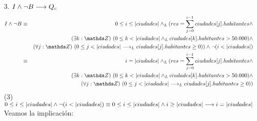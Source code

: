 \documentclass[10pt,a4paper,fleqn]{article}
\begin{document}
\item 3. $I \land \neg B \longrightarrow Q_c$\\
\begin{eqnarray}
    I \land \neg B &\equiv& 0 \leq i \leq |ciudades| \yLuego (res = \small \displaystyle \sum_{j=0}^{i-1} ciudades[j].habitantes \land \notag \\ & &\existe[unalinea]{k}{\ent}{0 \leq k< |ciudades| \yLuego ciudades[k].habitantes >  50.000 }\land \notag \\ & & \paraTodo[unalinea]{j}{\ent}{0\leq j < |ciudades| \implicaLuego ciudades[j].habitantes \geq 0}) \land \neg(i<|ciudades|) \\
    &\equiv& i=|ciudades| \yLuego (res = \small \displaystyle \sum_{j=0}^{i-1} ciudades[j].habitantes \land \notag \\ & &\existe[unalinea]{k}{\ent}{0 \leq k< |ciudades| \yLuego ciudades[k].habitantes >  50.000 }\land \notag \\ & & \paraTodo[unalinea]{j}{\ent}{0\leq j < |ciudades| \implicaLuego ciudades[j].habitantes \geq 0}) \notag 
 \end{eqnarray}
 (3) $0 \leq i \leq |ciudades| \land \neg(i<|ciudades|)\equiv 0 \leq i \leq |ciudades| \land i\geq |ciudades| \implica i = |ciudades|$\\
 Veamos la implicación:
\end{document}
